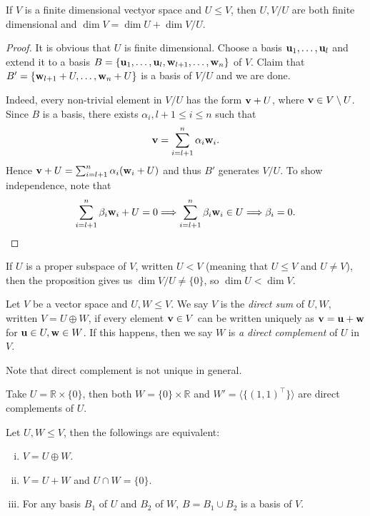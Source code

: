 \documentclass[a4paper]{article}
\begin{document}
\begin{proposition}
    If $V$ is a finite dimensional vectyor space and $U\le V$, then $U,V/U$ are both finite dimensional and $\dim V=\dim U+\dim V/U$.
\end{proposition}
\begin{proof}
    It is obvious that $U$ is finite dimensional.
    Choose a basis ${\bf u}_1,\ldots,{\bf u}_l$ and extend it to a basis $B=\{{\bf u}_1,\ldots,{\bf u}_l,{\bf w}_{l+1},\ldots,{\bf w}_n\}$ of $V$. Claim that $B'=\{{\bf w}_{l+1}+U,\ldots,{\bf w}_n+U\}$ is a basis of $V/U$ and we are done.

    Indeed, every non-trivial element in $ V/U $ has the form $ {\bf v}+U $, where $ {\bf v}\in V \setminus U $. Since $B$ is a basis, there exists $ \alpha_i,l+1\le i\le n $ such that 
    \[
        {\bf v} = \sum_{i=l+1}^{n}\alpha_i{\bf w}_i.
    \]
    Hence $ {\bf v}+U = \sum_{i=l+1}^{n}\alpha_i({\bf w}_i +U)$ and thus $ B' $ generates $V/U$. To show independence, note that 
    \[
        \sum_{i=l+1}^{n}\beta_i {\bf w}_i+U=0 \Longrightarrow \sum_{i=l+1}^{n}\beta_i {\bf w}_i\in U \Longrightarrow \beta_i=0.\qedhere
    \]
\end{proof}
\begin{remark}
    If $U$ is a proper subspace of $V$, written $U<V$ (meaning that $U\le V$ and $U\neq V$), then the proposition gives us $\dim V/U\neq \{0\}$, so $\dim U<\dim V$.
\end{remark}
\begin{definition}
    Let $V$ be a vector space and $U,W\le V$.
    We say $V$ is the \textit{direct sum} of $U,W$, written $V=U\oplus W$, if every element ${\bf v}\in V$ can be written uniquely as ${\bf v}={\bf u}+{\bf w}$ for ${\bf u}\in U,{\bf w}\in W$.
    If this happens, then we say $W$ is \textit{a direct complement} of $U$ in $V$.
\end{definition}
Note that direct complement is not unique in general.
\begin{example}
    Take $U=\mathbb R\times \{0\}$, then both $W=\{0\}\times \mathbb R$ and $W'=\langle\{(1,1)^\top\}\rangle$ are direct complements of $U$.
\end{example}
\begin{lemma}\label{equivalence_of_direct_sum}
    Let $U,W\le V$, then the followings are equivalent:
    \begin{enumerate}[(i)]
        \item $V=U\oplus W$.
        \item $V=U+W$ and $U\cap W=\{0\}$.
        \item For any basis $B_1$ of $U$ and $B_2$ of $W$, $B=B_1\cup B_2$ is a basis of $V$.
    \end{enumerate}
\end{lemma}
\end{document}
